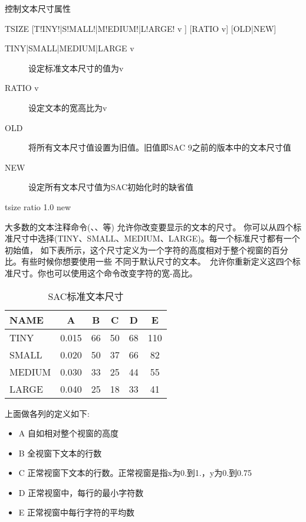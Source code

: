 \label{cmd:tsize}

控制文本尺寸属性

\begin{SACSTX}
TSIZE [T!INY!|S!MALL!|M!EDIUM!|L!ARGE! v ] [RATIO v] [OLD|NEW]
\end{SACSTX}

\begin{description}
\item [TINY|SMALL|MEDIUM|LARGE v] 设定标准文本尺寸的值为v
\item [RATIO v] 设定文本的宽高比为v
\item [OLD] 将所有文本尺寸值设置为旧值。旧值即SAC 9之前的版本中的文本尺寸值
\item [NEW] 设定所有文本尺寸值为SAC初始化时的缺省值
\end{description}

\begin{SACDFT}
tsize ratio 1.0 new
\end{SACDFT}

大多数的文本注释命令(、、等)
允许你改变要显示的文本的尺寸。
你可以从四个标准尺寸中选择(TINY、SMALL、MEDIUM、LARGE)。每一个标准尺寸都有一个初始值，
如下表所示，这个尺寸定义为一个字符的高度相对于整个视窗的百分比。有些时候你想要使用一些
不同于默认尺寸的文本。~允许你重新定义这四个标准尺寸。你也可以使用这个命令改变字符的宽-高比。
\begin{table}[!ht]
\centering
\caption{SAC标准文本尺寸}
\begin{tabular}{lccccc}
\toprule
NAME	&	A	&	B	&	C	&	D	&	E	\\
\midrule
TINY 	& 0.015 &   66 	&  50  	&	68  &	110	\\
SMALL	& 0.020 &	50  &  37  	&	66  &	82	\\
MEDIUM  & 0.030 &	33  &  25  	&	44  &	55	\\
LARGE	& 0.040 &	25  &  18  	&	33  &	41	\\
\bottomrule
\end{tabular}
\end{table}

上面做各列的定义如下:
\begin{itemize}
\item A 自如相对整个视窗的高度
\item B 全视窗下文本的行数
\item C 正常视窗下文本的行数。正常视窗是指x为0.到1.，y为0.到0.75
\item D 正常视窗中，每行的最小字符数
\item E 正常视窗中每行字符的平均数
\end{itemize}

